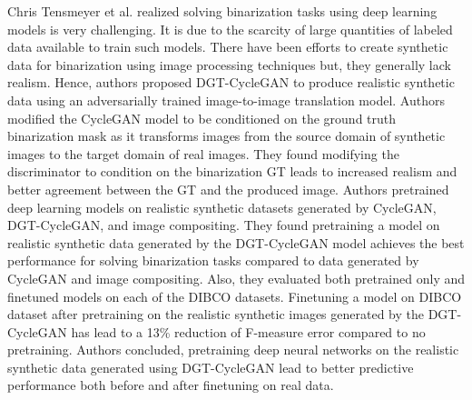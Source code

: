 Chris Tensmeyer et al.\cite{8978087} realized solving binarization tasks using deep learning models is very challenging. It is due to the scarcity of large quantities of labeled data available to train such models. There have been efforts to create synthetic data for binarization using image processing techniques but, they generally lack realism\cite{8978087}. Hence, authors proposed DGT-CycleGAN to produce realistic synthetic data using an adversarially trained image-to-image translation model\cite{8978087}. Authors modified the \ac{CycleGAN} model to be conditioned on the ground truth binarization mask as it transforms images from the source domain of synthetic images to the target domain of real images\cite{8978087}. They found modifying the discriminator to condition on the binarization \ac{GT} leads to increased realism and better agreement between the \ac{GT} and the produced image\cite{8978087}.  Authors pretrained deep learning models on realistic synthetic datasets generated by \ac{CycleGAN}, DGT-CycleGAN, and image compositing\cite{8978087}. They found pretraining a model on realistic synthetic data generated by the DGT-CycleGAN model achieves the best performance for solving binarization tasks compared to data generated by \ac{CycleGAN} and image compositing\cite{8978087}. Also, they evaluated both pretrained only and finetuned models on each of the \ac{DIBCO} datasets\footnotemark. Finetuning a model on \ac{DIBCO} dataset after pretraining on the realistic synthetic images generated by the DGT-CycleGAN has lead to a 13\% reduction of F-measure error compared to no pretraining. Authors concluded, pretraining deep neural networks on the realistic synthetic data generated using DGT-CycleGAN lead to better predictive performance both before and after finetuning on real data.



